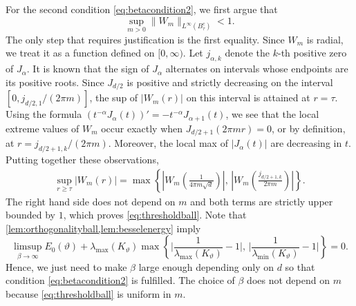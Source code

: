 \documentclass[11pt]{article}
\theoremstyle{definition}
\numberwithin{theorem}{section}
\numberwithin{lemma}{section}
\numberwithin{equation}{section}
\numberwithin{equation}{section}
\begin{document}
		For the second condition \eqref{eq:betacondition2}, we first argue that 
		\begin{equation}
			\label{eq:thresholdball}
			\sup_{m >0} \|W_m\|_{L^\infty(B_\tau^c)}
			<1.
		\end{equation}
		The only step that requires justification is the first equality. Since $W_m$ is radial, we treat it as a function defined on $[0,\infty)$. Let $j_{\alpha,k}$ denote the $k$-th positive zero of $J_{\alpha}$. It is known that the sign of $J_\alpha$ alternates on intervals whose endpoints are its positive roots. Since $J_{d/2}$ is positive and strictly decreasing on the interval $[0,j_{d/2,1}/(2\pi m)]$, the sup of $|W_m(r)|$ on this interval is attained at $r=\tau$. Using the formula $(t^{-\alpha}J_\alpha(t))'=-t^{-\alpha}J_{\alpha+1}(t)$, we see that the local extreme values of $W_m$ occur exactly when $J_{d/2+1}(2\pi m r)=0$, or by definition, at $r= j_{d/2+1,k}/(2\pi m)$. Moreover, the local max of $|J_\alpha(t)|$ are decreasing in $t$. Putting together these observations, 
		\begin{align*}
			\sup_{r\geq \tau} |W_m(r)|
			=\max \left\{ \left|W_m \left( \frac{1}{4\pi m \sqrt d} \right)\right|, \, \left|W_m\left( \frac{j_{d/2+1,k}}{2\pi m}\right) \right| \right\}. 
		\end{align*}
		The right hand side does not depend on $m$ and both terms are strictly upper bounded by $1$, which proves \eqref{eq:thresholdball}. Note that \cref{lem:orthogonalityball,lem:besselenergy} imply	
		$$
		\limsup_{\beta\to\infty} E_0(\vartheta)+\lambda_{\max}(K_\vartheta) \max\left\{ \Big| \frac 1 {\lambda_{\max}(K_\vartheta)}-1\Big|,\, \Big|\frac 1 {\lambda_{\min}(K_\vartheta)} - 1\Big| \right\} = 0.
		$$
		Hence, we just need to make $\beta$ large enough depending only on $d$ so that condition \eqref{eq:betacondition2} is fulfilled. The choice of $\beta$ does not depend on $m$ because \eqref{eq:thresholdball} is uniform in $m$.
		
\end{document}
